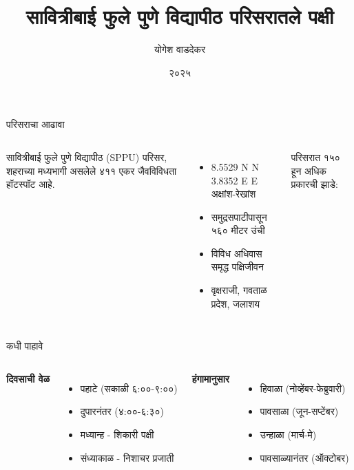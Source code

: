 \documentclass[aspectratio=169]{beamer}
\title{सावित्रीबाई फुले पुणे विद्यापीठ परिसरातले पक्षी}
\author{योगेश वाडदेकर}
\institute{सावित्रीबाई फुले पुणे विद्यापीठ}
\date{२०२५}
\newcommand{\latinphrase}[1]{{\latintext #1}}
\begin{document}
\begin{frame}
    \maketitle
\end{frame}

\begin{frame}{परिसराचा आढावा}
    \begin{columns}[T]
        सावित्रीबाई फुले पुणे विद्यापीठ ({\latinphrase SPPU}) परिसर, शहराच्या मध्यभागी असलेले ४११ एकर जैवविविधता हॉटस्पॉट आहे.
        \begin{itemize}
            \item {\latinphrase 18.5529 N} {\latinphrase N} {\latinphrase 73.8352 E} {\latinphrase E} अक्षांश-रेखांश
            \item समुद्रसपाटीपासून ५६० मीटर उंची
            \item विविध अधिवास समृद्ध पक्षिजीवन
            \item वृक्षराजी, गवताळ प्रदेश, जलाशय
        \end{itemize}
        परिसरात १५० हून अधिक प्रकारची झाडे:
    \end{columns}
\end{frame}

\begin{frame}{कधी पाहावे}
    \begin{columns}[T]
        \textbf{दिवसाची वेळ}
        \begin{itemize}
            \item पहाटे (सकाळी ६:००-९:००)
            \item दुपारनंतर (४:००-६:३०)
            \item मध्यान्ह - शिकारी पक्षी
            \item संध्याकाळ - निशाचर प्रजाती
        \end{itemize}
        \textbf{हंगामानुसार}
        \begin{itemize}
            \item हिवाळा (नोव्हेंबर-फेब्रुवारी)
            \item पावसाळा (जून-सप्टेंबर)
            \item उन्हाळा (मार्च-मे)
            \item पावसाळ्यानंतर (ऑक्टोबर)
        \end{itemize}
    \end{columns}
\end{frame}
\end{document}
